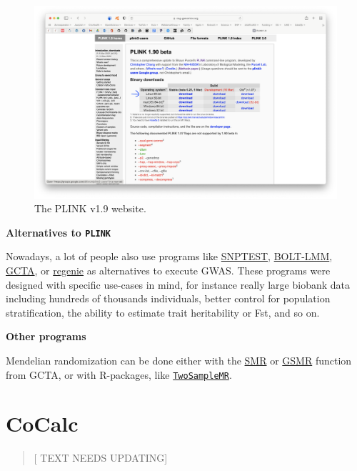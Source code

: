 \documentclass[
]{book}
\newcommand{\passthrough}[1]{#1}
\begin{document}
\begin{figure}[H]

{\centering \includegraphics[width=43.11in]{img/plink} 

}

\caption{The PLINK v1.9 website.}\label{fig:plink}
\end{figure}

\textbf{Alternatives to \passthrough{\lstinline!PLINK!}}

Nowadays, a lot of people also use programs like \href{snptest}{SNPTEST}, \href{https://data.broadinstitute.org/alkesgroup/BOLT-LMM/}{BOLT-LMM}, \href{http://cnsgenomics.com/software/gcta/\#Overview}{GCTA}, or \href{https://rgcgithub.github.io/regenie/}{regenie} as alternatives to execute GWAS. These programs were designed with specific use-cases in mind, for instance really large biobank data including hundreds of thousands individuals, better control for population stratification, the ability to estimate trait heritability or Fst, and so on.

\textbf{Other programs}

Mendelian randomization can be done either with the \href{http://cnsgenomics.com/software/smr/\#Overview}{SMR} or \href{http://cnsgenomics.com/software/gsmr/}{GSMR} function from GCTA, or with R-packages, like \href{https://mrcieu.github.io/TwoSampleMR/}{\passthrough{\lstinline!TwoSampleMR!}}.

\hypertarget{cocalc}{%
\section{CoCalc}\label{cocalc}}

\begin{quote}
{[} TEXT NEEDS UPDATING{]}
\end{quote}
\end{document}
